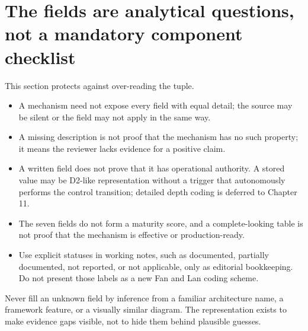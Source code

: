 \section{The fields are analytical questions, not a mandatory component checklist}
This section protects against over-reading the tuple.
\begin{itemize}
  \item A mechanism need not expose every field with equal detail; the source may be silent or the field may not apply in the same way.
  \item A missing description is not proof that the mechanism has no such property; it means the reviewer lacks evidence for a positive claim.
  \item A written field does not prove that it has operational authority. A stored value may be D2-like representation without a trigger that autonomously performs the control transition; detailed depth coding is deferred to Chapter 11.
  \item The seven fields do not form a maturity score, and a complete-looking table is not proof that the mechanism is effective or production-ready.
  \item Use explicit statuses in working notes, such as documented, partially documented, not reported, or not applicable, only as editorial bookkeeping. Do not present those labels as a new Fan and Lan coding scheme.
\end{itemize}
\begin{warningbox}
Never fill an unknown field by inference from a familiar architecture name, a framework feature, or a visually similar diagram. The representation exists to make evidence gaps visible, not to hide them behind plausible guesses.
\end{warningbox}

